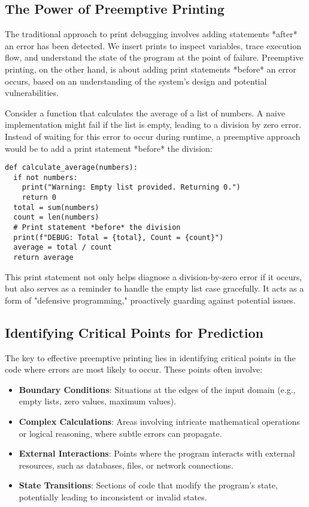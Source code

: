 \documentclass{article}
\begin{document}
{{{{\subsection*{The Power of Preemptive Printing}

The traditional approach to print debugging involves adding statements *after* an error has been detected. We insert prints to inspect variables, trace execution flow, and understand the state of the program at the point of failure. Preemptive printing, on the other hand, is about adding print statements *before* an error occurs, based on an understanding of the system's design and potential vulnerabilities.

Consider a function that calculates the average of a list of numbers. A naive implementation might fail if the list is empty, leading to a division by zero error. Instead of waiting for this error to occur during runtime, a preemptive approach would be to add a print statement *before* the division:

\begin{verbatim}
def calculate_average(numbers):
  if not numbers:
    print("Warning: Empty list provided. Returning 0.")
    return 0
  total = sum(numbers)
  count = len(numbers)
  # Print statement *before* the division
  print(f"DEBUG: Total = {total}, Count = {count}")
  average = total / count
  return average
\end{verbatim}

This print statement not only helps diagnose a division-by-zero error if it occurs, but also serves as a reminder to handle the empty list case gracefully. It acts as a form of "defensive programming," proactively guarding against potential issues.

\subsection*{Identifying Critical Points for Prediction}

The key to effective preemptive printing lies in identifying critical points in the code where errors are most likely to occur. These points often involve:

\begin{itemize}
    \item \textbf{Boundary Conditions}: Situations at the edges of the input domain (e.g., empty lists, zero values, maximum values).
    \item \textbf{Complex Calculations}: Areas involving intricate mathematical operations or logical reasoning, where subtle errors can propagate.
    \item \textbf{External Interactions}: Points where the program interacts with external resources, such as databases, files, or network connections.
    \item \textbf{State Transitions}: Sections of code that modify the program's state, potentially leading to inconsistent or invalid states.
\end{itemize}

}}}}
\end{document}
